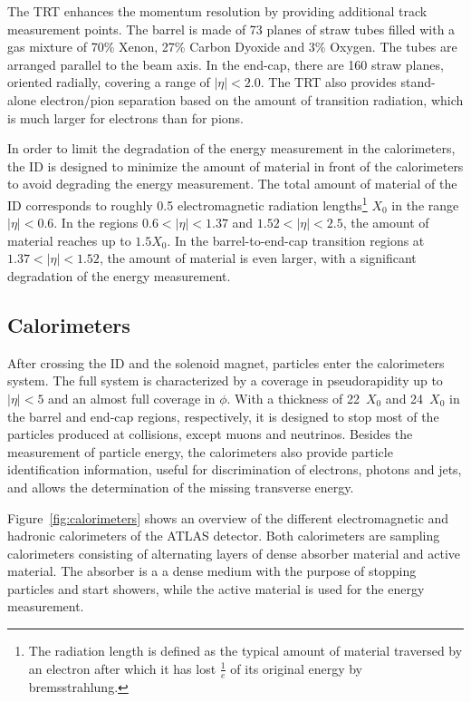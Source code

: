 The TRT enhances the momentum resolution by providing additional track
measurement points.
The barrel is made of 73 planes of straw tubes filled with a gas
mixture of 70\% Xenon, 27\% Carbon Dyoxide and 3\% Oxygen. The tubes
are arranged parallel to the beam axis.
In the end-cap, there are 160 straw planes, oriented radially,
covering a range of \mbox{$|\eta| < 2.0$}. 
The TRT also provides stand-alone electron/pion separation based on
the amount of transition radiation, which is much larger for electrons
than for pions.

In order to limit the degradation of the energy measurement in the
calorimeters, the ID is designed to minimize the amount of material in
front of the calorimeters to avoid degrading the energy measurement.
The total amount of material of the ID corresponds to roughly 0.5
electromagnetic radiation lengths\footnote{The radiation length is
  defined as the typical amount of material traversed by an electron
  after which it has lost $\frac{1}{e}$ of its original energy by
  bremsstrahlung.} $X_0$ in the range \mbox{$|\eta| < 0.6$}.
In the regions \mbox{$0.6 < |\eta| < 1.37$} and \mbox{$1.52 < |\eta| <
  2.5$}, the amount of material reaches up to \mbox{$1.5 X_0$}.
In the barrel-to-end-cap transition regions at \mbox{$1.37 < |\eta| <
  1.52$}, the amount of material is even larger, with a significant
degradation of the energy measurement.

\subsection{Calorimeters}
\label{sec:calorimeter}

After crossing the ID and the solenoid magnet, particles enter the
calorimeters system.
The full system is characterized by a coverage in pseudorapidity up to
$|\eta|<5$ and an almost full coverage in $\phi$. With  a thickness of
22~$X_0$ and 24~$X_0$ in the barrel and end-cap regions, respectively, 
it is designed to stop most of the particles produced at collisions,
except muons and neutrinos.
Besides the measurement of particle energy, the calorimeters also
provide particle identification information, useful for discrimination
of electrons, photons and jets, and allows the determination
of the missing transverse energy.

Figure~\ref{fig:calorimeters} shows an overview of the different
electromagnetic  and hadronic calorimeters of the ATLAS detector.
Both calorimeters are sampling calorimeters consisting of alternating
layers of dense absorber material and active material.
The absorber is a a dense medium with the purpose of stopping
particles and start showers, while the active material is used for the
energy measurement.

